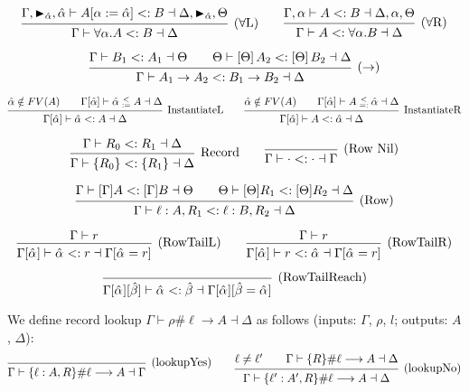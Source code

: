 \documentclass{article}
\newcommand{\marker}[1]{\RHD_{#1}}
\newcommand{\subtype}{<:}
\newcommand{\instLSymbol}{\;\substack{<\\:=}\;}
\newcommand{\instRSymbol}{\;\substack{<\\=:}\;}
\newcommand{\ev}{\hat}
\newcommand{\spc}{\qquad}
\newcommand{\apply}[1]{\left[#1\right]}
\newcommand{\eva}[1][]{\ev \alpha_{#1}}
\newcommand{\evb}{\ev \beta}
\newcommand{\subtypes}[4]{#1 \vdash #2 \subtype #3 \dashv #4}
\newcommand{\instL}[4]{#1 \vdash #2 \instLSymbol #3 \dashv #4}
\newcommand{\instR}[4]{#1 \vdash #2 \instRSymbol #3 \dashv #4}
\newcommand{\lookup}[5]{#1 \vdash #2 \# #3 \longrightarrow #4 \dashv #5}
\newcommand{\deduct}[3][]
{
  \begin{prooftree}
    \hypo{#2}
    \infer1[\text{#1}]{#3}
  \end{prooftree}
}
\begin{document}
\[
  \deduct[(\(\forall\)L)]
  { \subtypes{\Gamma, \marker{\ev\alpha}, \ev\alpha}{A[\alpha := \ev\alpha]}{B}{\Delta, \marker{\ev\alpha}, \Theta} }
  { \subtypes{\Gamma}{\forall \alpha. A}{B}{\Delta} }
  \spc
  \deduct[(\(\forall\)R)]
  { \subtypes{\Gamma, \alpha}{A}{B}{\Delta, \alpha, \Theta} }
  { \subtypes{\Gamma}{A}{\forall \alpha. B}{\Delta} }
\]

\[
  \deduct[(\(\to\))]
  { \subtypes{\Gamma}{B_1}{A_1}{\Theta} \spc \subtypes{\Theta}{\apply\Theta A_2}{\apply\Theta B_2}{\Delta} }
  { \subtypes{\Gamma}{A_1 \to A_2}{B_1 \to B_2}{\Delta} }
\]

\[
  \deduct[InstantiateL]
  {\ev \alpha \notin FV(A) \spc \instL{\Gamma[\ev \alpha]}{\ev
      \alpha}{A}{\Delta}}
  {\subtypes{\Gamma[\ev \alpha]}{\ev \alpha}{A}{\Delta}}
  \spc
  \deduct[InstantiateR]
  {\ev \alpha \notin FV(A) \spc \instR{\Gamma[\ev \alpha]}{A}{\ev
      \alpha}{\Delta}}
  {\subtypes{\Gamma[\ev \alpha]}{A}{\ev \alpha}{\Delta}}
\]

\[
  \deduct[Record]{\subtypes{\Gamma}{R_0}{R_1}{\Delta}}{\subtypes{\Gamma}{\{R_0\}}{\{R_1\}}{\Delta}}
  \spc
  \deduct[(Row Nil)]{}{ \subtypes{\Gamma}{\cdot}{\cdot}{\Gamma} }
\]

\[
  \deduct[(Row)]
  {\subtypes{\Gamma}{[\Gamma] A}{[\Gamma] B}{\Theta}
    \spc
    \subtypes{\Theta}{[\Theta] R_1}{[\Theta] R_2}{\Delta}
  }
  { \subtypes{\Gamma}{\ell : A, R_1}{\ell : B, R_2}{\Delta} }
\]

\[
  \deduct[(RowTailL)]
  {\Gamma \vdash r}
  {\subtypes{\Gamma[\eva]}{\eva}{r}{\Gamma[\eva=r]}}
  \spc
  \deduct[(RowTailR)]
  {\Gamma \vdash r}
  {\subtypes{\Gamma[\eva]}{r}{\eva}{\Gamma[\eva=r]}}
\]

\[
  \deduct[(RowTailReach)]
  {}
  {\subtypes{\Gamma[\eva][\evb]}{\eva}{\evb}{\Gamma[\eva][\evb=\eva]}}
\]

\noindent
We define record lookup $\lookup{\Gamma}{\rho}{\ell}{A}{\Delta}$ as follows (inputs: $\Gamma$, $\rho$, $l$; outputs: $A$, $\Delta$):
\[
\deduct[(lookupYes)]{}{\lookup{\Gamma}{\{\ell : A, R\}}{\ell}{A}{\Gamma}}
\spc
\deduct[(lookupNo)]
  {\ell \neq \ell' \spc \lookup{\Gamma}{\{R\}}{\ell}{A}{\Delta}}
  {\lookup{\Gamma}{\{\ell' : A', R\}}{\ell}{A}{\Delta}}
\]

\end{document}
